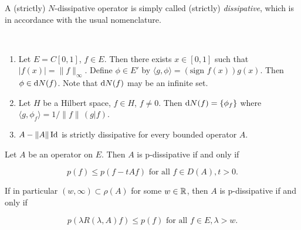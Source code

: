 A (strictly) $N$-dissipative operator is simply called (strictly) \emph{dissipative}, which is in accordance with the usual nomenclature.
\begin{examples}\label{ex:a2-2.2}  ~ 
\begin{enumerate}[\upshape(i), wide, labelindent=.5em]

\item \label{ex:a2-2.2.1}
Let $E = C[0,1]$, $f \in E$.
Then there exists $x \in [0,1]$ such that $|f(x)| = \|f\|_{\infty}$.
Define $\phi \in E'$ by $\langle g,\phi \rangle = (\text{sign } f(x))g(x)$.
Then $\phi \in \mathop{}\!\mathrm{d}{N}(f)$.
Note that $\mathop{}\!\mathrm{d}{N}(f)$ may be an infinite set.
\item \label{ex:a2-2.2.2}
Let $H$ be a Hilbert space, $f \in H$, $f \neq 0$.
Then  $\mathop{}\!\mathrm{d}{N}(f) = \{\phi_{f}\}$ where \\
$\langle g,\phi_{f} \rangle = 1/\|f\|\,(g|f)$.
\item \label{ex:a2-2.2.3}
$A - \|A\|\operatorname{Id}$ is strictly dissipative for every bounded operator $A$.
\end{enumerate}
\end{examples}
\begin{proposition}\label{prop:a2-2.3}
Let $A$ be an operator on $E$.
Then $A$ is p-dissipative if and only if

\begin{equation} \label{eq:a2-2.7}
p(f) \leq p(f - tAf) \text{ for all } f \in D(A), t > 0.
\end{equation}

If in particular $(w,\infty) \subset \rho(A)$ for some $w \in \mathbb{R}$, then $A$ is p-dissipative if and only if

\begin{equation}\label{eq:a2-2.8}
p(\lambda R(\lambda,A)f) \leq p(f) \text{ for all } f \in E, \lambda > w.
\end{equation}
\end{proposition}

